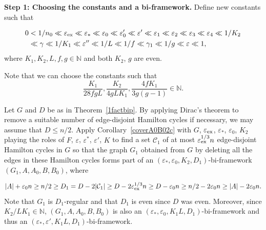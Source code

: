 \documentclass{memo-l}
\def\COMMENT#1{}
\def\cC{\mathcal{C}}
\def\eps{\varepsilon}
\def\epszero{\eps_0}
\numberwithin{section}{chapter}
\numberwithin{equation}{section}
\numberwithin{firstthm}{section}
\numberwithin{figure}{section}
\begin{document}
{\removelastskip{}\medskip{}

\noindent\textbf{Step 1: Choosing the constants and a bi-framework.}
Define new constants such that%
    \COMMENT{$\eps_3$ and $\eps_4$ are implicitly used when applying Corollary~\ref{BEScor}. } 
\begin{align}
0 & < 1/n_0 \ll \eps_{\rm ex} \ll \eps_* \ll \epszero \ll \eps'_0\ll \eps' \ll \eps_1 \ll \eps_2  \ll \eps_3 \ll
\eps_4\ll 1/K_2  \\
 &  \ll \gamma \ll 1/K_1 \ll  \eps''\ll 1/L \ll 1/f \ll \gamma_1  \ll 1/g \ll \eps\ll 1, \nonumber
\end{align}
where $K_1, K_2, L, f, g \in  \mathbb{N}$ and both $K_2$, $g$ are even.%
   \COMMENT{Daniela added $g$ even, we need this when applying Cor~\ref{rdeccorz} with $\ell':=g$} 
Note that we can choose the constants such that
$$\frac{K_1}{28fgL}, \frac{K_2}{4gLK_1}, \frac{4fK_1}{3g(g-1)} \in \mathbb{N}.$$

Let $G$ and $D$ be as in Theorem~\ref{1factbip}. By applying Dirac's theorem to remove a suitable number of edge-disjoint Hamilton cycles if necessary,
we may assume that $D\le n/2$. 
Apply Corollary~\ref{coverA0B02c} with $G$, $\eps_{\rm ex}$, $\eps_*$, $\eps _0$, $K_2$ playing the roles of $F$, $\eps$, $\eps ^*$, $\eps'$, $K$
to find a set $\cC_1$ of 
at most $\eps _{\rm ex} ^{1/3} n$ 
edge-disjoint Hamilton cycles in $G$ so that the graph $G_1$ obtained from $G$
by deleting all the edges in these Hamilton cycles forms part of an
$(\eps_*,\eps_0,K_2,D_1)$-bi-framework $(G_1,A,A_0,B,B_0)$, where%
   \COMMENT{Daniela added $=D-2|\cC_1|$ below, osthus added $|A|+\eps_0 n \ge n/2$ } 
\begin{equation} \label{D1eq}
|A|+\eps_0 n \ge n/2 \ge D_1 =D-2|\cC_1|\ge D-2\eps_{\rm ex}^{1/3}n\ge D-\eps_0 n \ge n/2-2\eps_0 n \ge |A|-2\eps_0 n.
\end{equation}
Note that  $G_1$ is $D_1$-regular and that $D_1$ is even since $D$ was even.
Moreover, since $K_2/LK_1\in\mathbb{N}$, $(G_1,A,A_0,B,B_0)$ is also an $(\eps_*,\eps_0,K_1L,D_1)$-bi-framework
and thus an $(\eps_*,\eps',K_1L,D_1)$-bi-framework.

}
\end{document}
